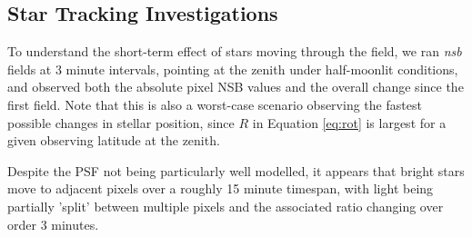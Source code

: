 \subsection{Star Tracking Investigations}

To understand the short-term effect of stars moving through the field, we ran \textit{nsb} fields at 3 minute intervals, pointing at the zenith under half-moonlit conditions, and observed both the absolute pixel NSB values and the overall change since the first field. Note that this is also a worst-case scenario observing the fastest possible changes in stellar position, since $R$ in Equation \ref{eq:rot} is largest for a given observing latitude at the zenith.

Despite the PSF not being particularly well modelled, it appears that bright stars move to adjacent pixels over a roughly 15 minute timespan, with light being partially 'split' between multiple pixels and the associated ratio changing over order 3 minutes.
